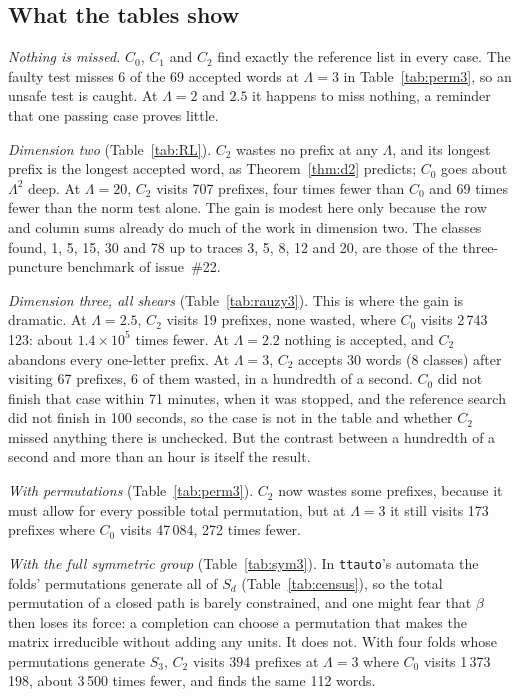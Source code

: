 \documentclass[11pt]{amsart}
\newcommand{\ttauto}{\texttt{ttauto}}
\newcommand{\Lam}{\Lambda}
\theoremstyle{plain}
\theoremstyle{definition}
\begin{document}


\subsection{What the tables show}

\emph{Nothing is missed.}  $C_0$, $C_1$ and $C_2$ find exactly the
reference list in every case.  The faulty test misses 6 of the 69 accepted
words at $\Lam=3$ in Table~\ref{tab:perm3}, so an unsafe test is caught.
At $\Lam=2$ and $2.5$ it happens to miss nothing, a reminder that one
passing case proves little.

\emph{Dimension two} (Table~\ref{tab:RL}).  $C_2$ wastes no prefix at any
$\Lam$, and its longest prefix is the longest accepted word, as
Theorem~\ref{thm:d2} predicts; $C_0$ goes about $\Lam^2$ deep.  At
$\Lam=20$, $C_2$ visits 707 prefixes, four times fewer than $C_0$ and 69
times fewer than the norm test alone.  The gain is modest here only because
the row and column sums already do much of the work in dimension two.  The
classes found, 1, 5, 15, 30 and 78 up to traces 3, 5, 8, 12 and 20, are
those of the three-puncture benchmark of issue~\#22.

\emph{Dimension three, all shears} (Table~\ref{tab:rauzy3}).  This is where
the gain is dramatic.  At $\Lam=2.5$, $C_2$ visits 19 prefixes, none
wasted, where $C_0$ visits 2\,743\,123: about $1.4\times10^5$ times fewer.
At $\Lam=2.2$ nothing is accepted, and $C_2$ abandons every one-letter
prefix.  At $\Lam=3$, $C_2$ accepts 30 words (8 classes) after visiting 67
prefixes, 6 of them wasted, in a hundredth of a second.  $C_0$ did not
finish that case within 71 minutes, when it was stopped, and the reference
search did not finish in 100 seconds, so the case is not in the table and
whether $C_2$ missed anything there is unchecked.  But the contrast between
a hundredth of a second and more than an hour is itself the result.

\emph{With permutations} (Table~\ref{tab:perm3}).  $C_2$ now wastes some
prefixes, because it must allow for every possible total permutation, but
at $\Lam=3$ it still visits 173 prefixes where $C_0$ visits 47\,084, 272
times fewer.

\emph{With the full symmetric group} (Table~\ref{tab:sym3}).  In
\ttauto's automata the folds' permutations generate all of $S_d$
(Table~\ref{tab:census}), so the total permutation of a closed path is
barely constrained, and one might fear that $\beta$ then loses its force:
a completion can choose a permutation that makes the matrix irreducible
without adding any units.  It does not.  With four folds whose
permutations generate $S_3$, $C_2$ visits 394 prefixes at $\Lam=3$ where
$C_0$ visits 1\,373\,198, about 3\,500 times fewer, and finds the same 112
words.
\end{document}
